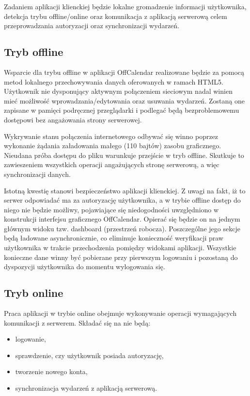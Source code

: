 Zadaniem aplikacji klienckiej będzie lokalne gromadzenie informacji użytkownika, detekcja trybu offline/online oraz komunikacja z aplikacją serwerową celem przeprowadzania autoryzacji oraz synchronizacji wydarzeń.

\subsection{Tryb offline}
\label{trybOff}

Wsparcie dla trybu offline w aplikacji OffCalendar realizowane będzie za pomocą metod lokalnego przechowywania danych oferowanych w ramach HTML5. Użytkownik nie dysponujący aktywnym połączeniem sieciowym nadal winien mieć możliwość wprowadzania/edytowania oraz usuwania wydarzeń. Zostaną one zapisane w pamięci podręcznej przeglądarki i podlegać będą bezproblemowemu dostępowi bez angażowania strony serwerowej.

Wykrywanie stanu połączenia internetowego odbywać się winno poprzez wykonanie żądania załadowania małego (110 bajtów) zasobu graficznego. Nieudana próba dostępu do pliku warunkuje przejście w tryb offline. Skutkuje to zawieszeniem wszystkich operacji angażujących stronę serwerową, a więc synchronizacji danych.
	
Istotną kwestię stanowi bezpieczeństwo aplikacji klienckiej. Z uwagi na fakt, iż to serwer odpowiadać ma za autoryzację użytkownika, a w trybie offline dostęp do niego nie będzie możliwy, pojawiające się niedogodności uwzględniono w konstrukcji interfejsu graficznego OffCalendar. Opierać się będzie on na jednym głównym widoku tzw. dashboard (przestrzeń robocza). Poszczególne jego sekcje będą ładowane asynchronicznie, co eliminuje konieczność weryfikacji praw użytkownika w trakcie przechodzenia pomiędzy widokami aplikacji. Wszystkie konieczne dane winny być pobierane przy pierwszym logowaniu i pozostaną do dyspozycji użytkownika do momentu wylogowania się.

\subsection{Tryb online}
\label{trybOn}

Praca aplikacji w trybie online obejmuje wykonywanie operacji wymagających komunikacji z serwerem. Składać się na nie będą:

\begin{itemize}
\item logowanie,
\item sprawdzenie, czy użytkownik posiada autoryzację,
\item tworzenie nowego konta,
\item synchronizacja wydarzeń z aplikacją serwerową.
\end{itemize}

